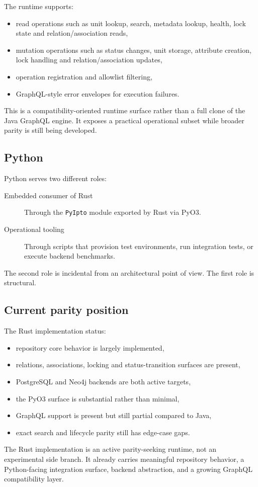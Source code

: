 The runtime supports:
\begin{itemize}
\item read operations such as unit lookup, search, metadata lookup, health, lock state and relation/association reads,
\item mutation operations such as status changes, unit storage, attribute creation, lock handling and relation/association updates,
\item operation registration and allowlist filtering,
\item GraphQL-style error envelopes for execution failures.
\end{itemize}

This is a compatibility-oriented runtime surface rather than a full clone of the Java GraphQL engine. It exposes a practical operational subset while broader parity is still being developed.

\subsection{Python}

Python serves two different roles:
\begin{description}
\item[Embedded consumer of Rust] Through the \texttt{PyIpto} module exported by Rust via PyO3.
\vspace{.2cm}
\item[Operational tooling] Through scripts that provision test environments, run integration tests, or execute backend benchmarks.
\end{description}

The second role is incidental from an architectural point of view. The first role is structural.

\subsection{Current parity position}

The Rust implementation status:
\begin{itemize}
\item repository core behavior is largely implemented,
\item relations, associations, locking and status-transition surfaces are present,
\item PostgreSQL and Neo4j backends are both active targets,
\item the PyO3 surface is substantial rather than minimal,
\item GraphQL support is present but still partial compared to Java,
\item exact search and lifecycle parity still has edge-case gaps.
\end{itemize}

The Rust implementation is an active parity-seeking runtime, not an experimental side branch. It already carries meaningful repository behavior, a Python-facing integration surface, backend abstraction, and a growing GraphQL compatibility layer.
